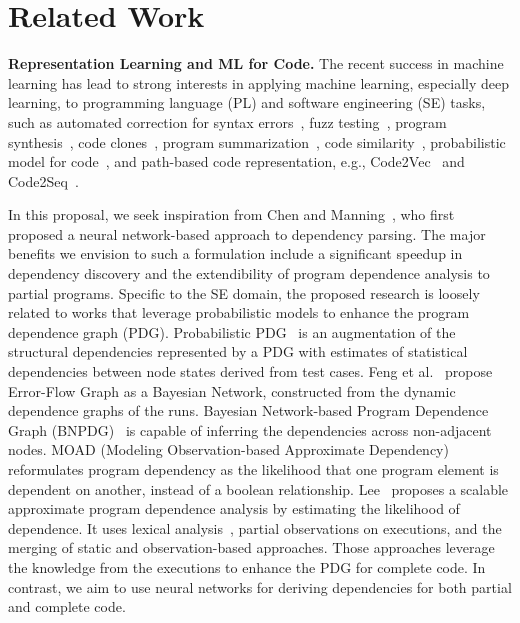\section{Related Work}
\textbf{Representation Learning and ML for Code.}  The recent success in
machine learning has lead to strong interests in applying machine
learning, especially deep learning, to programming language (PL) and
software engineering (SE) tasks, such as automated correction for
syntax errors~\cite{Bhatia-2016}, fuzz testing~\cite{Patra-2016},
program synthesis~\cite{Amodio-2017}, code
clones~\cite{White-2016,Smith-2009,Li-2017}, program
summarization~\cite{Allamanis-2016,Mou-2014}, code
similarity~\cite{Zhao-2018,Alon-2018}, probabilistic model for
code~\cite{Bielik-2016}, and path-based code representation,
e.g., Code2Vec~\cite{Alon-2018} and Code2Seq~\cite{alon2018code2seq}. 

In this proposal, we seek inspiration from Chen and Manning~\cite{chen-manning-2014-fast}, who first proposed a neural network-based approach to dependency parsing. The major benefits we envision to such a formulation include a significant speedup in dependency discovery and the extendibility of program dependence analysis to partial programs. 
Specific to the SE domain, 
the proposed research is loosely related to works that leverage probabilistic models to enhance the program dependence graph (PDG). Probabilistic PDG~\cite{baah-issta08-probabilistic} is an augmentation of the structural dependencies represented by a PDG with estimates of statistical dependencies between node states derived from test cases. Feng et al.~\cite{feng-paste10} propose Error-Flow Graph as a Bayesian Network, constructed from the dynamic dependence graphs of the runs. Bayesian Network-based Program Dependence Graph (BNPDG)~\cite{yu-jss17-bayesian} is capable of inferring the dependencies across non-adjacent nodes. MOAD (Modeling Observation-based Approximate Dependency)~\cite{lee-scam19-moad} reformulates program dependency as the likelihood that one program element is dependent on another, instead of a boolean relationship.  Lee~\cite{lee-icse20} proposes a scalable approximate program dependence analysis by estimating the likelihood of dependence. It uses lexical analysis~\cite{lee-jss20}, partial observations on executions, and the merging of static and observation-based approaches. Those approaches leverage the knowledge from the executions to enhance the PDG for complete code. In contrast, we aim to use neural networks for deriving dependencies for both partial and complete code.


